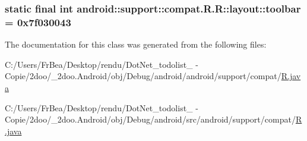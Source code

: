 \hypertarget{classandroid_1_1support_1_1compat_1_1_r_1_1layout_31dd18676b0833427a9e301b70df5a85}{
\subsubsection[{toolbar}]{\setlength{\rightskip}{0pt plus 5cm}static final int android::support::compat.R.R::layout::toolbar = 0x7f030043}}
\label{classandroid_1_1support_1_1compat_1_1_r_1_1layout_31dd18676b0833427a9e301b70df5a85}




The documentation for this class was generated from the following files:\begin{CompactItemize}
\item 
C:/Users/FrBea/Desktop/rendu/DotNet\_\-todolist\_ - Copie/2doo/\_\-2doo.Android/obj/Debug/android/android/support/compat/\hyperlink{android_2support_2compat_2_r_8java}{R.java}\item 
C:/Users/FrBea/Desktop/rendu/DotNet\_\-todolist\_ - Copie/2doo/\_\-2doo.Android/obj/Debug/android/src/android/support/compat/\hyperlink{src_2android_2support_2compat_2_r_8java}{R.java}\end{CompactItemize}
